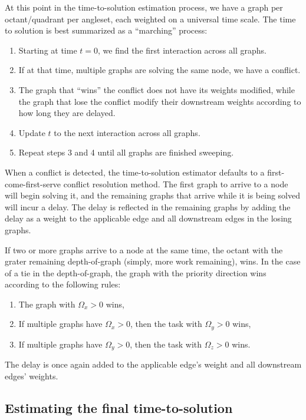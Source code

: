 At this point in the time-to-solution estimation process, we have a graph per octant/quadrant per angleset, each weighted on a universal time scale. The time to solution is best summarized as a ``marching'' process:
\begin{enumerate}
  \item Starting at time $t=0$, we find the first interaction across all graphs. 
  \item If at that time, multiple graphs are solving the same node, we have a conflict. 
  \item The graph that ``wins'' the conflict does not have its weights modified, while the graph that lose the conflict modify their downstream weights according to how long they are delayed. 
  \item Update $t$ to the next interaction across all graphs. 
  \item Repeat steps 3 and 4 until all graphs are finished sweeping.
\end{enumerate}

When a conflict is detected, the time-to-solution estimator defaults to a first-come-first-serve conflict resolution method. The first graph to arrive to a node will begin solving it, and the remaining graphs that arrive while it is being solved will incur a delay. The delay is reflected in the remaining graphs by adding the delay as a weight to the applicable edge and all downstream edges in the losing graphs. 

If two or more graphs arrive to a node at the same time, the octant with the grater remaining depth-of-graph (simply, more work remaining), wins. In the case of a tie in the depth-of-graph, the graph with the priority direction wins according to the following rules:
\begin{enumerate}
    \item The graph with $\Omega_x > 0$ wins,
	\item If multiple graphs have $\Omega_x > 0$, then the task with $\Omega_y > 0$ wins,
	\item If multiple graphs have $\Omega_y > 0$, then the task with $\Omega_z > 0$ wins.
\end{enumerate}
The delay is once again added to the applicable edge's weight and all downstream edges' weights.

\subsection{Estimating the final time-to-solution}

